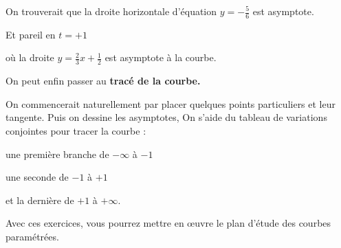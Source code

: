 On trouverait que la droite horizontale d'équation $y=-\frac{5}{6}$ 
est asymptote.
  
  
\change  

Et pareil en $t=+1$

\change
où la droite $y=\frac{2}{3}x+\frac{1}{2}$ est asymptote à la courbe.



\diapo

On peut enfin passer au \textbf{tracé de la courbe.}

On commencerait naturellement par placer 
quelques points particuliers et leur tangente. 
Puis on dessine les asymptotes,
On s'aide du tableau de variations conjointes
pour tracer la courbe :

une première branche de $-\infty$ à $-1$

une seconde de $-1$ à $+1$

et la dernière de $+1$ à $+\infty$.







\diapo

Avec ces exercices, vous pourrez mettre en 
œuvre le plan d'étude des courbes paramétrées. 





